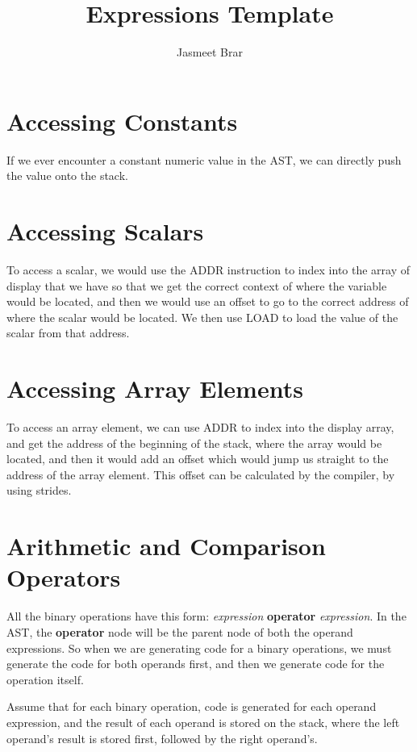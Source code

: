 \documentclass{article}
\begin{document}
	\title{Expressions Template}
	\author{Jasmeet Brar}
    \maketitle


\section{Accessing Constants}

If we ever encounter a constant numeric value in the AST, we can directly push the value onto the stack.

\section{Accessing Scalars}

To access a scalar, we would use the ADDR instruction to index into the array of display that we have so that we get the correct context of where the variable would be located, and then we would use an offset to go to the correct address of where the scalar would be located. We then use LOAD to load the value of the scalar from that address.

\section{Accessing Array Elements}

To access an array element, we can use ADDR to index into the display array, and get the address of the beginning of the stack, where the array would be located, and then it would add an offset which would jump us straight to the address of the array element. This offset can be calculated by the compiler, by using strides.

\section{Arithmetic and Comparison Operators}

All the binary operations have this form: \textit{expression} \textbf{operator} \textit{expression}. In the AST, the \textbf{operator} node will be the parent node of both the operand expressions. So when we are generating code for a binary operations, we must generate the code for both operands first, and then we generate code for the operation itself.

Assume that for each binary operation, code is generated for each operand expression, and the result of each operand is stored on the stack, where the left operand's result is stored first, followed by the right operand's.
\end{document}
